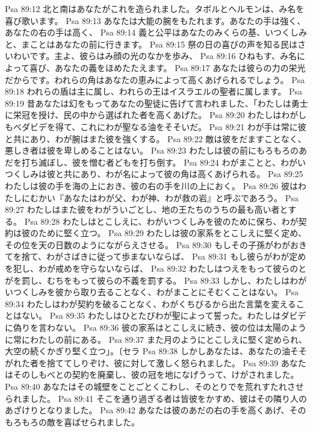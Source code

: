 Psa 89:12  北と南はあなたがこれを造られました。タボルとヘルモンは、み名を喜び歌います。
Psa 89:13  あなたは大能の腕をもたれます。あなたの手は強く、あなたの右の手は高く、
Psa 89:14  義と公平はあなたのみくらの基、いつくしみと、まことはあなたの前に行きます。
Psa 89:15  祭の日の喜びの声を知る民はさいわいです。主よ、彼らはみ顔の光のなかを歩み、
Psa 89:16  ひねもす、み名によって喜び、あなたの義をほめたたえます。
Psa 89:17  あなたは彼らの力の栄光だからです。われらの角はあなたの恵みによって高くあげられるでしょう。
Psa 89:18  われらの盾は主に属し、われらの王はイスラエルの聖者に属します。
Psa 89:19  昔あなたは幻をもってあなたの聖徒に告げて言われました、「わたしは勇士に栄冠を授け、民の中から選ばれた者を高くあげた。
Psa 89:20  わたしはわがしもべダビデを得て、これにわが聖なる油をそそいだ。
Psa 89:21  わが手は常に彼と共にあり、わが腕はまた彼を強くする。
Psa 89:22  敵は彼をだますことなく、悪しき者は彼を卑しめることはない。
Psa 89:23  わたしは彼の前にもろもろのあだを打ち滅ぼし、彼を憎む者どもを打ち倒す。
Psa 89:24  わがまことと、わがいつくしみは彼と共にあり、わが名によって彼の角は高くあげられる。
Psa 89:25  わたしは彼の手を海の上におき、彼の右の手を川の上におく。
Psa 89:26  彼はわたしにむかい『あなたはわが父、わが神、わが救の岩』と呼ぶであろう。
Psa 89:27  わたしはまた彼をわがういごとし、地の王たちのうちの最も高い者とする。
Psa 89:28  わたしはとこしえに、わがいつくしみを彼のために保ち、わが契約は彼のために堅く立つ。
Psa 89:29  わたしは彼の家系をとこしえに堅く定め、その位を天の日数のようにながらえさせる。
Psa 89:30  もしその子孫がわがおきてを捨て、わがさばきに従って歩まないならば、
Psa 89:31  もし彼らがわが定めを犯し、わが戒めを守らないならば、
Psa 89:32  わたしはつえをもって彼らのとがを罰し、むちをもって彼らの不義を罰する。
Psa 89:33  しかし、わたしはわがいつくしみを彼から取り去ることなく、わがまことにそむくことはない。
Psa 89:34  わたしはわが契約を破ることなく、わがくちびるから出た言葉を変えることはない。
Psa 89:35  わたしはひとたびわが聖によって誓った。わたしはダビデに偽りを言わない。
Psa 89:36  彼の家系はとこしえに続き、彼の位は太陽のように常にわたしの前にある。
Psa 89:37  また月のようにとこしえに堅く定められ、大空の続くかぎり堅く立つ」。〔セラ
Psa 89:38  しかしあなたは、あなたの油そそがれた者を捨ててしりぞけ、彼に対して激しく怒られました。
Psa 89:39  あなたはそのしもべとの契約を廃棄し、彼の冠を地になげうって、けがされました。
Psa 89:40  あなたはその城壁をことごとくこわし、そのとりでを荒れすたれさせられました。
Psa 89:41  そこを通り過ぎる者は皆彼をかすめ、彼はその隣り人のあざけりとなりました。
Psa 89:42  あなたは彼のあだの右の手を高くあげ、そのもろもろの敵を喜ばせられました。
